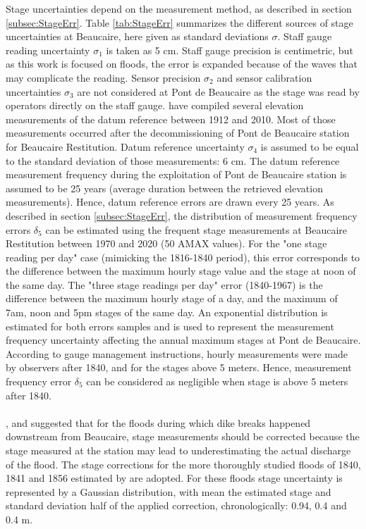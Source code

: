 \documentclass[11pt]{article}
\begin{document}
    Stage uncertainties depend on the measurement method, as described in section \ref{subsec:StageErr}. Table \ref{tab:StageErr} summarizes the different sources of stage uncertainties at Beaucaire, here given as standard deviations $\sigma$. Staff gauge reading uncertainty $\sigma_1$ is taken as 5 cm. Staff gauge precision is centimetric, but as this work is focused on floods, the error is expanded because of the waves that may complicate the reading. 
    Sensor precision $\sigma_2$ and sensor calibration uncertainties $\sigma_3$ are not considered at Pont de Beaucaire as the stage was read by operators directly on the staff gauge. 
    \citet{bard_actualisation_2018} have compiled several elevation measurements of the datum reference between 1912 and 2010. Most of those measurements occurred after the decommissioning of Pont de Beaucaire station for Beaucaire Restitution. Datum reference uncertainty $\sigma_4$ is assumed to be equal to the standard deviation of those measurements: 6 cm. The datum reference measurement frequency during the exploitation of Pont de Beaucaire station is assumed to be 25 years (average duration between the retrieved elevation measurements). Hence, datum reference errors are drawn every 25 years. 
    As described in section \ref{subsec:StageErr}, the distribution of measurement frequency errors $\delta_5$ can be estimated using the frequent stage measurements at Beaucaire Restitution between 1970 and 2020 (50 AMAX values). For the "one stage reading per day" case (mimicking the 1816-1840 period), this error corresponds to the difference between the maximum hourly stage value and the stage at noon of the same day. The "three stage readings per day" error (1840-1967) is the difference between the maximum hourly stage of a day, and the maximum of 7am, noon and 5pm stages of the same day. An exponential distribution is estimated for both errors samples and is used to represent the measurement frequency uncertainty affecting the annual maximum stages at Pont de Beaucaire. According to gauge management instructions, hourly measurements were made by observers after 1840, and for the stages above 5 meters. Hence, measurement frequency error $\delta_5$ can be considered as negligible when stage is above 5 meters after 1840.
    \paragraph{}
    \citet{symadrem_programme_2012}, \citet{pichard_hauteurs_2013} and \citet{bard_actualisation_2018} suggested that for the floods during which dike breaks happened downstream from Beaucaire, stage measurements should be corrected because the stage measured at the station may lead to underestimating the actual discharge of the flood. The stage corrections for the more thoroughly studied floods of 1840, 1841 and 1856 estimated by \citet{symadrem_programme_2012} are adopted. For these floods stage uncertainty is represented by a Gaussian distribution, with mean the estimated stage and standard deviation half of the applied correction, chronologically: 0.94, 0.4 and 0.4 m. 
\end{document}
